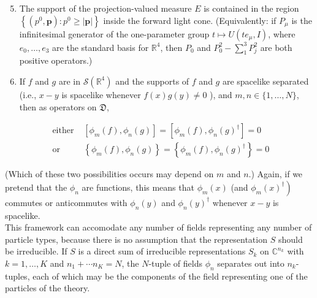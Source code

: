 \documentclass[10pt, letterpaper]{article}
\begin{document}
\begin{enumerate}
  \setcounter{enumi}{4}
  \item The support of the projection-valued measure $E$ is contained in the region $\left\{\left(p^{0}, \mathbf{p}\right): p^{0} \geq|\mathbf{p}|\right\}$ inside the forward light cone. (Equivalently: if $P_{\mu}$ is the infinitesimal generator of the one-parameter group $t \mapsto U\left(t e_{\mu}, I\right)$, where $e_{0}, \ldots, e_{3}$ are the standard basis for $\mathbb{R}^{4}$, then $P_{0}$ and $P_{0}^{2}-\sum_{1}^{3} P_{j}^{2}$ are both positive operators.)
  \item If $f$ and $g$ are in $\mathcal{S}\left(\mathbb{R}^{4}\right)$ and the supports of $f$ and $g$ are spacelike separated (i.e., $x-y$ is spacelike whenever $f(x) g(y) \neq 0$ ), and $m, n \in\{1, \ldots, N\}$, then as operators on $\mathfrak{D}$,
\end{enumerate}

$$
\begin{aligned}
\text { either } & {\left[\phi_{m}(f), \phi_{n}(g)\right]=\left[\phi_{m}(f), \phi_{n}(g)^{\dagger}\right]=0 } \\
\text { or } & \left\{\phi_{m}(f), \phi_{n}(g)\right\}=\left\{\phi_{m}(f), \phi_{n}(g)^{\dagger}\right\}=0
\end{aligned}
$$

(Which of these two possibilities occurs may depend on $m$ and $n$.) Again, if we pretend that the $\phi_{n}$ are functions, this means that $\phi_{m}(x)$ (and $\left.\phi_{m}(x)^{\dagger}\right)$ commutes or anticommutes with $\phi_{n}(y)$ and $\phi_{n}(y)^{\dagger}$ whenever $x-y$ is spacelike.\\
This framework can accomodate any number of fields representing any number of particle types, because there is no assumption that the representation $S$ should be irreducible. If $S$ is a direct sum of irreducible representations $S_{k}$ on $\mathbb{C}^{n_{k}}$ with $k=1, \ldots, K$ and $n_{1}+\cdots n_{K}=N$, the $N$-tuple of fields $\phi_{n}$ separates out into $n_{k}$-tuples, each of which may be the components of the field representing one of the particles of the theory.
\end{document}
